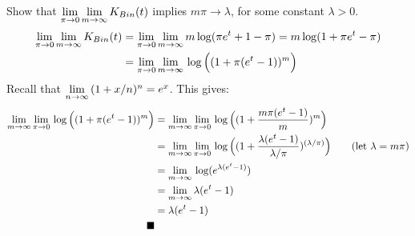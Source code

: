 \label{q7_CGF}Show that $\underset{\pi\rightarrow 0}{\lim}\,\underset{m\rightarrow \infty}{\lim}\, K_{Bin}(t)$ implies $m\pi \rightarrow \lambda$, for some constant $\lambda > 0$. 
\begin{align*}
   \underset{\pi\rightarrow 0}{\lim}\,\underset{m\rightarrow \infty}{\lim}\, K_{Bin}(t) &=\underset{\pi\rightarrow 0}{\lim}\,\underset{m\rightarrow \infty}{\lim}\,  m\log(\pi e^t + 1-\pi)= m\log( 1 +\pi e^t -\pi)\\
         &=\underset{\pi\rightarrow 0}{\lim}\,\underset{m\rightarrow \infty}{\lim}\,\log\Big( (1 +\pi (e^t -1))^m\Big)
\end{align*}
Recall that $\underset{n\rightarrow \infty}{\lim}\,(1+x/n)^n = e^x$.
This gives:
\begin{align*}
    \underset{m\rightarrow \infty}{\lim}\,\underset{\pi\rightarrow 0}{\lim}\,\log\Big( (1 +\pi (e^t -1))^m\Big) &= \underset{m\rightarrow \infty}{\lim}\,\underset{\pi\rightarrow 0}{\lim}\,\log\Big( (1 +\frac{m\pi (e^t -1)}{m})^m\Big)\\
                          &= \underset{m\rightarrow \infty}{\lim}\,\underset{\pi\rightarrow 0}{\lim}\,\log\Big( (1 +\frac{\lambda (e^t -1)}{\lambda/\pi})^{(\lambda/\pi)}\Big) \tag*{(let $ \lambda = m\pi$)}\\
                          &=\underset{m\rightarrow \infty}{\lim}\,\log(e^{\lambda(e^t-1)}) \\
                          &=\underset{m\rightarrow \infty}{\lim}\,\lambda(e^t-1) \\
                          &=\lambda(e^t-1) \\
    \blacksquare
\end{align*}



